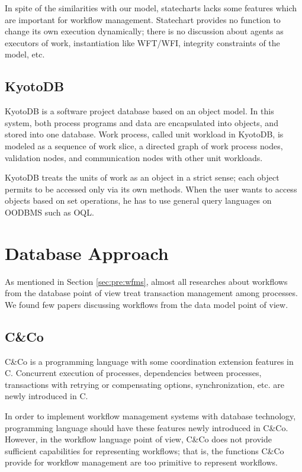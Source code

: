 In spite of the similarities with our model, statecharts lacks some
features which are important for workflow management.  Statechart
provides no function to change its own execution dynamically; there is no
discussion about agents as executors of work, instantiation like
WFT/WFI, integrity constraints of the model, etc.

\subsection{KyotoDB}

KyotoDB \cite{matsumoto:asst90} is a software project database based on
an object model.  In this system, both process programs and data are
encapsulated into objects, and stored into one database.  Work process,
called unit workload in KyotoDB, is modeled as a sequence of work slice,
a directed graph of work process nodes, validation nodes, and
communication nodes with other unit workloads.

KyotoDB treats the units of work as an object in a strict sense; each
object permits to be accessed only via its own methods.  When the user
wants to access objects based on set operations, he has to use general
query languages on OODBMS such as OQL.

\section{Database Approach}

As mentioned in Section \ref{sec:pre:wfms}, almost all researches about
workflows from the database point of view treat transaction management
among processes.  We found few papers discussing workflows from the data
model point of view.

\subsection{C\&Co}

C\&Co \cite{forst:jdps95} is a programming language with some
coordination extension features in C\@.  Concurrent execution of
processes, dependencies between processes, transactions with retrying or
compensating options, synchronization, etc. are newly introduced in C.

In order to implement workflow management systems with database
technology, programming language should have these features newly
introduced in C\&Co.  However, in the workflow language point of view,
C\&Co does not provide sufficient capabilities for representing
workflows; that is, the functions C\&Co provide for workflow management
are too primitive to represent workflows.

